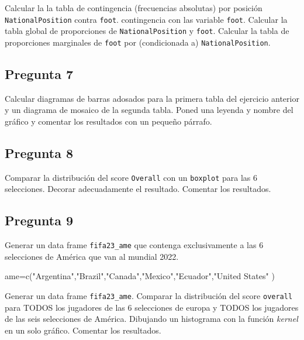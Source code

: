 \documentclass[
]{article}
\newenvironment{Shaded}{\begin{snugshade}}{\end{snugshade}}
\newcommand{\FunctionTok}[1]{\textcolor[rgb]{0.00,0.00,0.00}{#1}}
\newcommand{\NormalTok}[1]{#1}
\newcommand{\OtherTok}[1]{\textcolor[rgb]{0.56,0.35,0.01}{#1}}
\newcommand{\StringTok}[1]{\textcolor[rgb]{0.31,0.60,0.02}{#1}}
\begin{document}
Calcular la la tabla de contingencia (frecuencias absolutas) por
posición \texttt{NationalPosition} contra \texttt{foot}. contingencia
con las variable \texttt{foot}. Calcular la tabla global de proporciones
de \texttt{NationalPosition} y \texttt{foot}. Calcular la tabla de
proporciones marginales de \texttt{foot} por (condicionada a)
\texttt{NationalPosition}.

\hypertarget{pregunta-7}{%
\subsection{Pregunta 7}\label{pregunta-7}}

Calcular diagramas de barras adosados para la primera tabla del
ejercicio anterior y un diagrama de mosaico de la segunda tabla. Poned
una leyenda y nombre del gráfico y comentar los resultados con un
pequeño párrafo.

\hypertarget{pregunta-8}{%
\subsection{Pregunta 8}\label{pregunta-8}}

Comparar la distribución del score \texttt{Overall} con un
\texttt{boxplot} para las 6 selecciones. Decorar adecuadamente el
resultado. Comentar los resultados.

\hypertarget{pregunta-9}{%
\subsection{Pregunta 9}\label{pregunta-9}}

Generar un data frame \texttt{fifa23\_ame} que contenga exclusivamente a
las 6 selecciones de América que van al mundial 2022.

\begin{Shaded}
\begin{Highlighting}[]
\NormalTok{ame}\OtherTok{=}\FunctionTok{c}\NormalTok{(}\StringTok{"Argentina"}\NormalTok{,}\StringTok{"Brazil"}\NormalTok{,}\StringTok{"Canada"}\NormalTok{,}\StringTok{"Mexico"}\NormalTok{,}\StringTok{"Ecuador"}\NormalTok{,}\StringTok{"United States"}\NormalTok{ )}
\end{Highlighting}
\end{Shaded}

Generar un data frame \texttt{fifa23\_ame}. Comparar la distribución del
score \texttt{overall} para TODOS los jugadores de las 6 selecciones de
europa y TODOS los jugadores de las seis selecciones de América.
Dibujando un histograma con la función \emph{kernel} en un solo gráfico.
Comentar los resultados.
\end{document}
